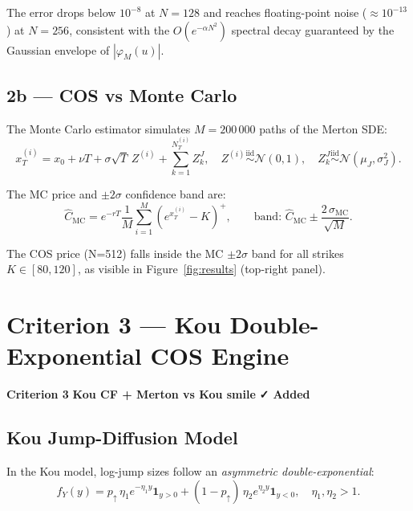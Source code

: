 \documentclass[12pt, a4paper]{article}
\theoremstyle{definition}
\newcommand{\Norm}{\mathcal{N}}
\newcommand{\crit}[2]{%
  \noindent\colorbox{#1!15}{\color{#1}\textbf{Criterion #2}}\quad}
\begin{document}
The error drops below $10^{-8}$ at $N=128$ and reaches floating-point noise
($\approx 10^{-13}$) at $N=256$, consistent with the $O(e^{-\alpha N^2})$
spectral decay guaranteed by the Gaussian envelope of $|\varphi_M(u)|$.

\subsection{2b — COS vs Monte Carlo}

The Monte Carlo estimator simulates $M=200\,000$ paths of the Merton SDE:
\begin{equation}
  x_T^{(i)} = x_0 + \nu T + \sigma\sqrt{T}\,Z^{(i)} + \sum_{k=1}^{N_T^{(i)}} Z_k^J,
  \quad Z^{(i)}\overset{\text{iid}}{\sim}\Norm(0,1),
  \quad Z_k^J\overset{\text{iid}}{\sim}\Norm(\mu_J,\sigma_J^2).
\end{equation}

The MC price and $\pm2\sigma$ confidence band are:
\begin{equation}
  \hat C_{\text{MC}} = e^{-rT}\frac{1}{M}\sum_{i=1}^M (e^{x_T^{(i)}}-K)^+,
  \qquad
  \text{band: } \hat C_{\text{MC}} \pm \frac{2\,\hat\sigma_{\text{MC}}}{\sqrt{M}}.
\end{equation}

The COS price (N=512) falls inside the MC $\pm2\sigma$ band for all strikes
$K\in[80,120]$, as visible in Figure~\ref{fig:results} (top-right panel).

\section{Criterion 3 — Kou Double-Exponential COS Engine}

\crit{critred}{3} \textbf{Kou CF + Merton vs Kou smile} \hfill \textcolor{critred}{\textbf{✓ Added}}

\subsection{Kou Jump-Diffusion Model}

In the Kou model, log-jump sizes follow an \emph{asymmetric double-exponential}:
\begin{equation}
  f_Y(y) = p_{\uparrow}\,\eta_1 e^{-\eta_1 y}\mathbf{1}_{y>0}
           + (1-p_{\uparrow})\,\eta_2 e^{\eta_2 y}\mathbf{1}_{y<0},
  \quad \eta_1,\eta_2>1.
\end{equation}
\end{document}
